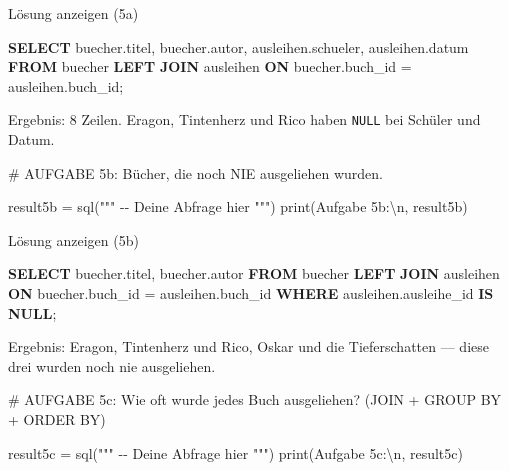 \documentclass[
  nswissgerman,
  a4paper,
  DIV=11,
  numbers=noendperiod,
  ngerman]{scrreprt}
\newenvironment{Shaded}{\begin{snugshade}}{\end{snugshade}}
\newcommand{\BuiltInTok}[1]{\textcolor[rgb]{0.00,0.23,0.31}{#1}}
\newcommand{\CharTok}[1]{\textcolor[rgb]{0.13,0.47,0.30}{#1}}
\newcommand{\CommentTok}[1]{\textcolor[rgb]{0.37,0.37,0.37}{#1}}
\newcommand{\KeywordTok}[1]{\textcolor[rgb]{0.00,0.23,0.31}{\textbf{#1}}}
\newcommand{\NormalTok}[1]{\textcolor[rgb]{0.00,0.23,0.31}{#1}}
\newcommand{\OperatorTok}[1]{\textcolor[rgb]{0.37,0.37,0.37}{#1}}
\newcommand{\StringTok}[1]{\textcolor[rgb]{0.13,0.47,0.30}{#1}}
\begin{document}
Lösung anzeigen (5a)

\begin{Shaded}
\begin{Highlighting}[numbers=left,,]
\KeywordTok{SELECT}\NormalTok{ buecher.titel, buecher.autor,}
\NormalTok{       ausleihen.schueler, ausleihen.datum}
\KeywordTok{FROM}\NormalTok{ buecher}
\KeywordTok{LEFT} \KeywordTok{JOIN}\NormalTok{ ausleihen}
  \KeywordTok{ON}\NormalTok{ buecher.buch\_id }\OperatorTok{=}\NormalTok{ ausleihen.buch\_id;}
\end{Highlighting}
\end{Shaded}

Ergebnis: 8 Zeilen. Eragon, Tintenherz und Rico haben \texttt{NULL} bei
Schüler und Datum.

\begin{Shaded}
\begin{Highlighting}[numbers=left,,]
\CommentTok{\# AUFGABE 5b: Bücher, die noch NIE ausgeliehen wurden.}

\NormalTok{result5b }\OperatorTok{=}\NormalTok{ sql(}\StringTok{"""}
\StringTok{{-}{-} Deine Abfrage hier}
\StringTok{"""}\NormalTok{)}
\BuiltInTok{print}\NormalTok{(}\StringTok{\textquotesingle{}Aufgabe 5b:}\CharTok{\textbackslash{}n}\StringTok{\textquotesingle{}}\NormalTok{, result5b)}
\end{Highlighting}
\end{Shaded}

Lösung anzeigen (5b)

\begin{Shaded}
\begin{Highlighting}[numbers=left,,]
\KeywordTok{SELECT}\NormalTok{ buecher.titel, buecher.autor}
\KeywordTok{FROM}\NormalTok{ buecher}
\KeywordTok{LEFT} \KeywordTok{JOIN}\NormalTok{ ausleihen}
  \KeywordTok{ON}\NormalTok{ buecher.buch\_id }\OperatorTok{=}\NormalTok{ ausleihen.buch\_id}
\KeywordTok{WHERE}\NormalTok{ ausleihen.ausleihe\_id }\KeywordTok{IS} \KeywordTok{NULL}\NormalTok{;}
\end{Highlighting}
\end{Shaded}

Ergebnis: Eragon, Tintenherz und Rico, Oskar und die Tieferschatten ---
diese drei wurden noch nie ausgeliehen.

\begin{Shaded}
\begin{Highlighting}[numbers=left,,]
\CommentTok{\# AUFGABE 5c: Wie oft wurde jedes Buch ausgeliehen? (JOIN + GROUP BY + ORDER BY)}

\NormalTok{result5c }\OperatorTok{=}\NormalTok{ sql(}\StringTok{"""}
\StringTok{{-}{-} Deine Abfrage hier}
\StringTok{"""}\NormalTok{)}
\BuiltInTok{print}\NormalTok{(}\StringTok{\textquotesingle{}Aufgabe 5c:}\CharTok{\textbackslash{}n}\StringTok{\textquotesingle{}}\NormalTok{, result5c)}
\end{Highlighting}
\end{Shaded}
\end{document}
